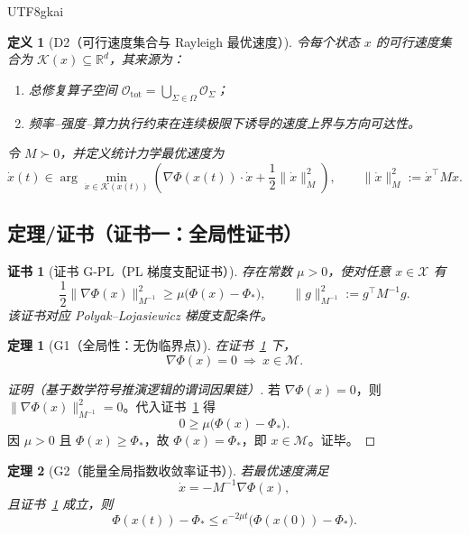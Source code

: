 \documentclass[12pt]{article}
\newtheorem{definition}{定义}[section]
\newtheorem{theorem}{定理}[section]
\newtheorem{Certificate}{证书}[section]
\newcommand{\RR}{\mathbb{R}}
\begin{document}
\begin{CJK*}{UTF8}{gkai}
\begin{definition}[D2（可行速度集合与 Rayleigh 最优速度）]
\label{def:tex28-ch12-d2}
令每个状态 $x$ 的可行速度集合为 $\mathcal{K}(x)\subseteq\RR^d$，其来源为：
\begin{enumerate}
  \item 总修复算子空间 $\mathcal{O}_{\mathrm{tot}}=\bigcup_{\Sigma\in\Omega}\mathcal{O}_{\Sigma}$；
  \item 频率--强度--算力执行约束在连续极限下诱导的速度上界与方向可达性。
\end{enumerate}
令 $M\succ0$，并定义统计力学最优速度为
\[
  \dot x(t)\in
  \arg\min_{\dot x\in\mathcal{K}(x(t))}
  \left(
    \nabla\Phi(x(t))\cdot \dot x + \frac12\|\dot x\|_M^2
  \right),
  \qquad
  \|\dot x\|_M^2:=\dot x^\top M\dot x.
\]
\end{definition}

\subsection{定理/证书（证书一：全局性证书）}
\label{subsec:tex28-ch12-global-cert}

\begin{Certificate}[证书 G-PL（PL 梯度支配证书）]
\label{cert:tex28-ch12-gpl}
存在常数 $\mu>0$，使对任意 $x\in\mathcal{X}$ 有
\[
  \boxed{
    \frac12\|\nabla\Phi(x)\|_{M^{-1}}^2
    \ge
    \mu\bigl(\Phi(x)-\Phi_*\bigr)
  },
  \qquad
  \|g\|_{M^{-1}}^2:=g^\top M^{-1}g.
\]
该证书对应 Polyak--Lojasiewicz 梯度支配条件\cite{polyak1963,karimi2016}。
\end{Certificate}

\begin{theorem}[G1（全局性：无伪临界点）]
\label{thm:tex28-ch12-g1}
在证书~\ref{cert:tex28-ch12-gpl} 下，
\[
  \nabla\Phi(x)=0\ \Longrightarrow\ x\in\mathcal{M}.
\]
\end{theorem}

\begin{proof}[证明（基于数学符号推演逻辑的谓词因果链）]
若 $\nabla\Phi(x)=0$，则 $\|\nabla\Phi(x)\|_{M^{-1}}^2=0$。代入证书~\ref{cert:tex28-ch12-gpl} 得
\[
  0\ge \mu\bigl(\Phi(x)-\Phi_*\bigr).
\]
因 $\mu>0$ 且 $\Phi(x)\ge\Phi_*$，故 $\Phi(x)=\Phi_*$，即 $x\in\mathcal{M}$。证毕。
\end{proof}

\begin{theorem}[G2（能量全局指数收敛率证书）]
\label{thm:tex28-ch12-g2}
若最优速度满足
\[
  \dot x=-M^{-1}\nabla\Phi(x),
\]
且证书~\ref{cert:tex28-ch12-gpl} 成立，则
\[
  \Phi(x(t))-\Phi_*
  \le
  e^{-2\mu t}\bigl(\Phi(x(0))-\Phi_*\bigr).
\]
\end{theorem}


\end{CJK*}
\end{document}
